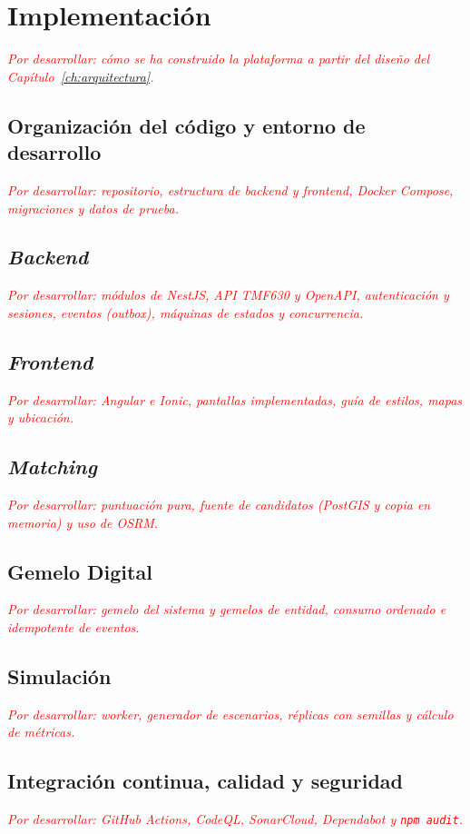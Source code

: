 
\providecommand{\pordesarrollar}[1]{\textcolor{red}{\textit{Por desarrollar: #1}}}

\chapter{Implementación}
\label{ch:implementacion}

\pordesarrollar{cómo se ha construido la plataforma a partir del diseño del Capítulo~\ref{ch:arquitectura}.}

\section{Organización del código y entorno de desarrollo}
\pordesarrollar{repositorio, estructura de \textit{backend} y \textit{frontend}, Docker Compose, migraciones y datos de prueba.}

\section{\textit{Backend}}
\pordesarrollar{módulos de NestJS, API TMF630 y OpenAPI, autenticación y sesiones, eventos (\textit{outbox}), máquinas de estados y concurrencia.}

\section{\textit{Frontend}}
\pordesarrollar{Angular e Ionic, pantallas implementadas, guía de estilos, mapas y ubicación.}

\section{\textit{Matching}}
\pordesarrollar{puntuación pura, fuente de candidatos (PostGIS y copia en memoria) y uso de OSRM.}

\section{Gemelo Digital}
\pordesarrollar{gemelo del sistema y gemelos de entidad, consumo ordenado e idempotente de eventos.}

\section{Simulación}
\pordesarrollar{\textit{worker}, generador de escenarios, réplicas con semillas y cálculo de métricas.}

\section{Integración continua, calidad y seguridad}
\pordesarrollar{GitHub Actions, CodeQL, SonarCloud, Dependabot y \texttt{npm audit}.}
